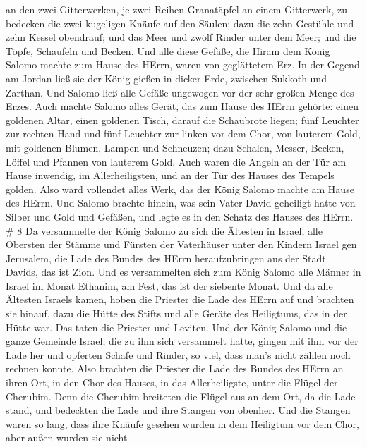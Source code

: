 an den zwei Gitterwerken, je zwei Reihen Granatäpfel an einem
Gitterwerk, zu bedecken die zwei kugeligen Knäufe auf den Säulen;
 dazu die zehn Gestühle und zehn Kessel obendrauf;
 und das Meer und zwölf Rinder unter dem Meer;
 und die Töpfe, Schaufeln und Becken. Und alle diese
Gefäße, die Hiram dem König Salomo machte zum Hause des HErrn, waren von
geglättetem Erz.  In der Gegend am Jordan ließ sie der
König gießen in dicker Erde, zwischen Sukkoth und Zarthan. 
Und Salomo ließ alle Gefäße ungewogen vor der sehr großen Menge des
Erzes.  Auch machte Salomo alles Gerät, das zum Hause des
HErrn gehörte: einen goldenen Altar, einen goldenen Tisch, darauf die
Schaubrote liegen;  fünf Leuchter zur rechten Hand und fünf
Leuchter zur linken vor dem Chor, von lauterem Gold, mit goldenen
Blumen, Lampen und Schneuzen;  dazu Schalen, Messer,
Becken, Löffel und Pfannen von lauterem Gold. Auch waren die Angeln an
der Tür am Hause inwendig, im Allerheiligsten, und an der Tür des Hauses
des Tempels golden.  Also ward vollendet alles Werk, das
der König Salomo machte am Hause des HErrn. Und Salomo brachte hinein,
was sein Vater David geheiligt hatte von Silber und Gold und Gefäßen,
und legte es in den Schatz des Hauses des HErrn. \# 8  Da
versammelte der König Salomo zu sich die Ältesten in Israel, alle
Obersten der Stämme und Fürsten der Vaterhäuser unter den Kindern Israel
gen Jerusalem, die Lade des Bundes des HErrn heraufzubringen aus der
Stadt Davids, das ist Zion.  Und es versammelten sich zum
König Salomo alle Männer in Israel im Monat Ethanim, am Fest, das ist
der siebente Monat.  Und da alle Ältesten Israels kamen,
hoben die Priester die Lade des HErrn auf  und brachten sie
hinauf, dazu die Hütte des Stifts und alle Geräte des Heiligtums, das in
der Hütte war. Das taten die Priester und Leviten.  Und der
König Salomo und die ganze Gemeinde Israel, die zu ihm sich versammelt
hatte, gingen mit ihm vor der Lade her und opferten Schafe und Rinder,
so viel, dass man's nicht zählen noch rechnen konnte.  Also
brachten die Priester die Lade des Bundes des HErrn an ihren Ort, in den
Chor des Hauses, in das Allerheiligste, unter die Flügel der Cherubim.
 Denn die Cherubim breiteten die Flügel aus an dem Ort, da
die Lade stand, und bedeckten die Lade und ihre Stangen von obenher.
 Und die Stangen waren so lang, dass ihre Knäufe gesehen
wurden in dem Heiligtum vor dem Chor, aber außen wurden sie nicht
